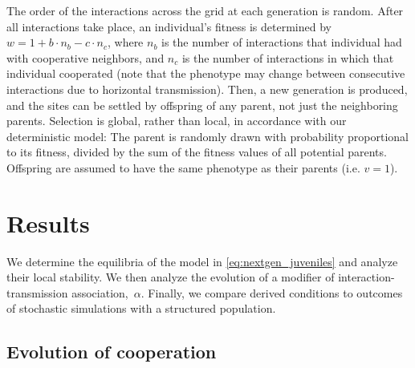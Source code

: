 \documentclass[12pt]{extarticle}
\begin{document}
The order of the interactions across the grid at each generation is random.
After all interactions take place, an individual's fitness is determined by
$w = 1 + b \cdot n_b - c \cdot n_c$,
where $n_b$ is the number of interactions that individual had with cooperative neighbors,
and $n_c$ is the number of interactions in which that individual cooperated (note that the phenotype may change between consecutive interactions due to horizontal transmission).
Then, a new generation is produced, and the sites can be settled by offspring of any parent, not just the neighboring parents.
Selection is global, rather than local, in accordance with our deterministic model:
The parent is randomly drawn with probability proportional to its fitness, divided by the sum of the fitness values of all potential parents.
Offspring are assumed to have the same phenotype as their parents (i.e. $v=1$).

\newpage
\newpage
\section{Results}

We determine the equilibria of the model in \autoref{eq:nextgen_juveniles}
and analyze their local stability.
We then analyze the evolution of a modifier of interaction-transmission association,~$\alpha$.
Finally, we compare derived conditions to outcomes of stochastic simulations with a structured population.

\subsection{Evolution of cooperation}
\end{document}
